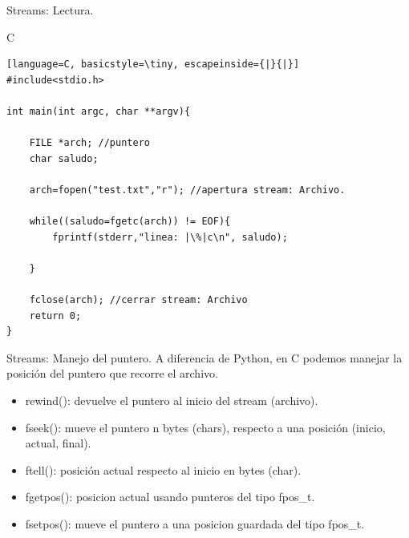 \documentclass{beamer}
\begin{document}
\begin{frame}[fragile]{Streams: Lectura.}
\begin{exampleblock}{C}
\begin{lstlisting}[language=C, basicstyle=\tiny, escapeinside={|}{|}]
#include<stdio.h>

int main(int argc, char **argv){

	FILE *arch; //puntero
	char saludo;

	arch=fopen("test.txt","r"); //apertura stream: Archivo.

	while((saludo=fgetc(arch)) != EOF){
		fprintf(stderr,"linea: |\%|c\n", saludo);

	}

	fclose(arch); //cerrar stream: Archivo
	return 0;
}
\end{lstlisting}
\end{exampleblock}
\end{frame}

\begin{frame}[fragile]{Streams: Manejo del puntero.}
A diferencia de Python, en C podemos manejar la posición del puntero que recorre el archivo.
\begin{itemize}
	\item rewind(): devuelve el puntero al inicio del stream (archivo).
	\item fseek(): mueve el puntero n bytes (chars), respecto a una posición (inicio, actual, final). 
	\item ftell(): posición actual respecto al inicio en bytes (char).
	\item fgetpos(): posicion actual usando punteros del tipo fpos\_t.
	\item fsetpos(): mueve el puntero a una posicion guardada del tipo fpos\_t.
	\end{itemize}
\end{frame}
\end{document}
